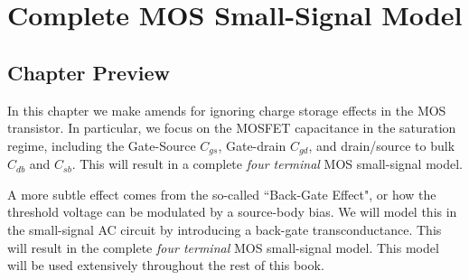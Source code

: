 




\chapter{Complete MOS Small-Signal Model}



\graphicspath{{./figs_mos_ss_ac/}}



\section{Chapter Preview}


In this chapter we make amends for ignoring charge storage effects in the MOS transistor.  In particular, we focus on the MOSFET capacitance in the saturation regime, including the Gate-Source $C_{gs}$, Gate-drain $C_{gd}$, and drain/source to bulk $C_{db}$ and $C_{sb}$.  This will result in a complete \emph{four terminal} MOS small-signal model.  

A more subtle effect comes from the so-called ``Back-Gate Effect", or how the threshold voltage can be modulated by a source-body bias.  We will model this in the small-signal AC circuit by introducing a back-gate transconductance.  This will result in the complete \emph{four terminal} MOS small-signal model.  This model will be used extensively throughout the rest of this book.
 




 


%
%
%
%
% 
%





